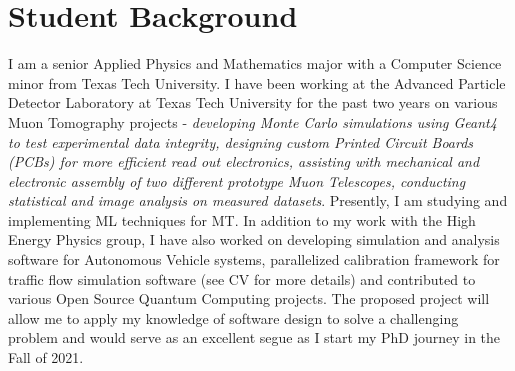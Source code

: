 \documentclass[10pt]{article}
\begin{document}

\newpage
\section{Student Background}

I am a senior Applied Physics and Mathematics major with a Computer Science minor from Texas Tech University. I have been working at the Advanced Particle Detector Laboratory at Texas Tech University for the past two years on various Muon Tomography projects - \textit{developing Monte Carlo simulations using Geant4 to test experimental data integrity, designing custom Printed Circuit Boards (PCBs) for more efficient read out electronics, assisting with mechanical and electronic assembly of two different prototype Muon Telescopes, conducting statistical and image analysis on measured datasets}. Presently, I am studying and implementing ML techniques for MT. In addition to my work with the High Energy Physics group, I have also worked on developing simulation and analysis software for Autonomous Vehicle systems, parallelized calibration framework for traffic flow simulation software (see CV for more details) and contributed to various Open Source Quantum Computing projects. The proposed project will allow me to apply my knowledge of software design to solve a challenging problem and would serve as an excellent segue as I start my PhD journey in the Fall of 2021.

\end{document}
